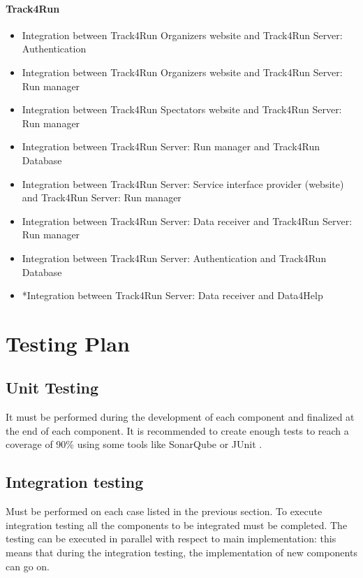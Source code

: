 		\paragraph{Track4Run}
		\begin{itemize}
			\item{Integration between Track4Run Organizers website and Track4Run Server: Authentication}
			\item{Integration between Track4Run Organizers website and Track4Run Server: Run manager}
			\item{Integration between Track4Run Spectators website and Track4Run Server: Run manager}
			\item{Integration between Track4Run Server: Run manager and Track4Run Database}
			\item{Integration between Track4Run Server: Service interface provider (website) and Track4Run Server: Run manager}
			\item{Integration between Track4Run Server: Data receiver and Track4Run Server: Run manager}
			\item{Integration between Track4Run Server: Authentication and Track4Run Database}
			\item{*Integration between Track4Run Server: Data receiver and Data4Help}
		\end{itemize}

	\section{Testing Plan}
		\subsection{Unit Testing}
		It must be performed during the development of each component and finalized at the end of each component. It is recommended to create enough tests to reach a coverage of 90\% using some tools like SonarQube or JUnit .
		
		\subsection{Integration testing} Must be performed on each case listed in the previous section. To execute integration testing all the components to be integrated must be completed. The testing can be executed in parallel with respect to main implementation: this means that during the integration testing, the implementation of new components can go on.\\

\thispagestyle{fancy}
 
